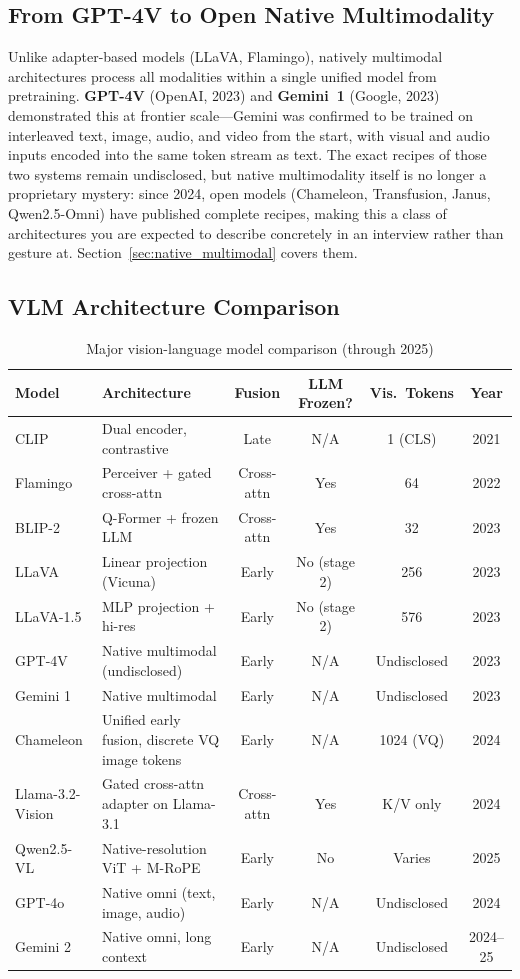 \subsection{From GPT-4V to Open Native Multimodality}

Unlike adapter-based models (LLaVA, Flamingo), natively multimodal architectures process all modalities within a single unified model from pretraining. \textbf{GPT-4V} (OpenAI, 2023) and \textbf{Gemini~1} (Google, 2023) demonstrated this at frontier scale---Gemini was confirmed to be trained on interleaved text, image, audio, and video from the start, with visual and audio inputs encoded into the same token stream as text. The exact recipes of those two systems remain undisclosed, but native multimodality itself is no longer a proprietary mystery: since 2024, open models (Chameleon, Transfusion, Janus, Qwen2.5-Omni) have published complete recipes, making this a class of architectures you are expected to describe concretely in an interview rather than gesture at. Section~\ref{sec:native_multimodal} covers them.

\subsection{VLM Architecture Comparison}

\begin{table}[H]
\centering
\caption{Major vision-language model comparison (through 2025)}
\begin{tabularx}{\textwidth}{lXcccc}
\toprule
\textbf{Model} & \textbf{Architecture} & \textbf{Fusion} & \textbf{LLM Frozen?} & \textbf{Vis.\ Tokens} & \textbf{Year} \\
\midrule
CLIP & Dual encoder, contrastive & Late & N/A & 1 (CLS) & 2021 \\
Flamingo & Perceiver + gated cross-attn & Cross-attn & Yes & 64 & 2022 \\
BLIP-2 & Q-Former + frozen LLM & Cross-attn & Yes & 32 & 2023 \\
LLaVA & Linear projection (Vicuna) & Early & No (stage 2) & 256 & 2023 \\
LLaVA-1.5 & MLP projection + hi-res & Early & No (stage 2) & 576 & 2023 \\
GPT-4V & Native multimodal (undisclosed) & Early & N/A & Undisclosed & 2023 \\
Gemini 1 & Native multimodal & Early & N/A & Undisclosed & 2023 \\
Chameleon & Unified early fusion, discrete VQ image tokens & Early & N/A & 1024 (VQ) & 2024 \\
Llama-3.2-Vision & Gated cross-attn adapter on Llama-3.1 & Cross-attn & Yes & K/V only & 2024 \\
Qwen2.5-VL & Native-resolution ViT + M-RoPE & Early & No & Varies & 2025 \\
GPT-4o & Native omni (text, image, audio) & Early & N/A & Undisclosed & 2024 \\
Gemini 2 & Native omni, long context & Early & N/A & Undisclosed & 2024--25 \\
\bottomrule
\end{tabularx}
\end{table}

